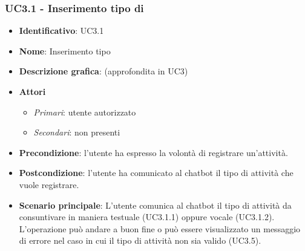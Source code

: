 \subsubsection{UC3.1 - Inserimento tipo di }
\begin{itemize}
    \item \textbf{Identificativo}: UC3.1 
    \item \textbf{Nome}: Inserimento tipo  
    \item \textbf{Descrizione grafica}: (approfondita in UC3)
    \item \textbf{Attori}
        \begin{itemize} 
            \item \textit{Primari}: utente autorizzato
            \item \textit{Secondari}: non presenti
        \end{itemize}
    \item \textbf{Precondizione}: l'utente ha espresso la volontà di registrare un'attività. 
    \item \textbf{Postcondizione}: l'utente ha comunicato al chatbot il tipo di attività che vuole registrare. 
    \item \textbf{Scenario principale}: L'utente comunica al chatbot il tipo di attività da consuntivare in maniera testuale (UC3.1.1) oppure vocale (UC3.1.2). L'operazione può andare a buon fine o può essere visualizzato un messaggio di errore nel caso in cui il tipo di attività non sia valido (UC3.5).
\end{itemize}

